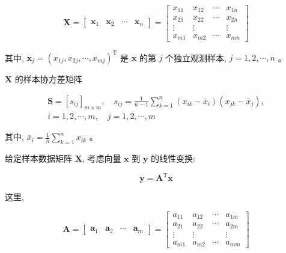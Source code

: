 \documentclass[10pt]{article}
\begin{document}
$$
\boldsymbol{X}=\left[\begin{array}{llll}
\boldsymbol{x}_{1} & \boldsymbol{x}_{2} & \cdots & \boldsymbol{x}_{n}
\end{array}\right]=\left[\begin{array}{cccc}
x_{11} & x_{12} & \cdots & x_{1 n} \\
x_{21} & x_{22} & \cdots & x_{2 n} \\
\vdots & \vdots & & \vdots \\
x_{m 1} & x_{m 2} & \cdots & x_{m n}
\end{array}\right]
$$

其中, $\boldsymbol{x}_{j}=\left(x_{1 j}, x_{2 j}, \cdots, x_{m j}\right)^{\mathrm{T}}$ 是 $\boldsymbol{x}$ 的第 $j$ 个独立观测样本, $j=1,2, \cdots, n$ 。

$\boldsymbol{X}$ 的样本协方差矩阵

$$
\begin{gathered}
\boldsymbol{S}=\left[s_{i j}\right]_{m \times m}, \quad s_{i j}=\frac{1}{n-1} \sum_{k=1}^{n}\left(x_{i k}-\bar{x}_{i}\right)\left(x_{j k}-\bar{x}_{j}\right), \\
i=1,2, \cdots, m, \quad j=1,2, \cdots, m
\end{gathered}
$$

其中, $\bar{x}_{i}=\frac{1}{n} \sum_{k=1}^{n} x_{i k}$ 。

给定样本数据矩阵 $\boldsymbol{X}$, 考虑向量 $\boldsymbol{x}$ 到 $\boldsymbol{y}$ 的线性变换:

$$
\boldsymbol{y}=\boldsymbol{A}^{\mathrm{T}} \boldsymbol{x}
$$

这里,

$$
\boldsymbol{A}=\left[\begin{array}{llll}
\boldsymbol{a}_{1} & \boldsymbol{a}_{2} & \cdots & \boldsymbol{a}_{m}
\end{array}\right]=\left[\begin{array}{cccc}
a_{11} & a_{12} & \cdots & a_{1 m} \\
a_{21} & a_{22} & \cdots & a_{2 m} \\
\vdots & \vdots & & \vdots \\
a_{m 1} & a_{m 2} & \cdots & a_{m m}
\end{array}\right]
$$
\end{document}
